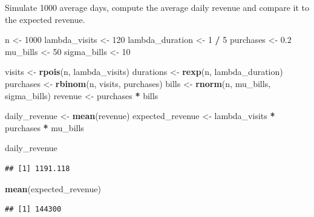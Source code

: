 \documentclass[
]{article}
\newenvironment{Shaded}{\begin{snugshade}}{\end{snugshade}}
\newcommand{\DecValTok}[1]{\textcolor[rgb]{0.00,0.00,0.81}{#1}}
\newcommand{\FloatTok}[1]{\textcolor[rgb]{0.00,0.00,0.81}{#1}}
\newcommand{\KeywordTok}[1]{\textcolor[rgb]{0.13,0.29,0.53}{\textbf{#1}}}
\newcommand{\NormalTok}[1]{#1}
\newcommand{\OperatorTok}[1]{\textcolor[rgb]{0.81,0.36,0.00}{\textbf{#1}}}
\newcommand{\StringTok}[1]{\textcolor[rgb]{0.31,0.60,0.02}{#1}}
\begin{document}
Simulate 1000 average days, compute the average daily revenue and
compare it to the expected revenue.

\begin{Shaded}
\begin{Highlighting}[]
\NormalTok{n \textless{}{-}}\StringTok{ }\DecValTok{1000}
\NormalTok{lambda\_visits \textless{}{-}}\StringTok{ }\DecValTok{120}
\NormalTok{lambda\_duration \textless{}{-}}\StringTok{ }\DecValTok{1} \OperatorTok{/}\StringTok{ }\DecValTok{5}
\NormalTok{purchases \textless{}{-}}\StringTok{ }\FloatTok{0.2}
\NormalTok{mu\_bills \textless{}{-}}\StringTok{ }\DecValTok{50}
\NormalTok{sigma\_bills \textless{}{-}}\StringTok{ }\DecValTok{10}

\NormalTok{visits \textless{}{-}}\StringTok{ }\KeywordTok{rpois}\NormalTok{(n, lambda\_visits)}
\NormalTok{durations \textless{}{-}}\StringTok{ }\KeywordTok{rexp}\NormalTok{(n, lambda\_duration)}
\NormalTok{purchases \textless{}{-}}\StringTok{ }\KeywordTok{rbinom}\NormalTok{(n, visits, purchases)}
\NormalTok{bills \textless{}{-}}\StringTok{ }\KeywordTok{rnorm}\NormalTok{(n, mu\_bills, sigma\_bills)}
\NormalTok{revenue \textless{}{-}}\StringTok{ }\NormalTok{purchases }\OperatorTok{*}\StringTok{ }\NormalTok{bills}

\NormalTok{daily\_revenue \textless{}{-}}\StringTok{ }\KeywordTok{mean}\NormalTok{(revenue)}
\NormalTok{expected\_revenue \textless{}{-}}\StringTok{ }\NormalTok{lambda\_visits }\OperatorTok{*}\StringTok{ }\NormalTok{purchases }\OperatorTok{*}\StringTok{ }\NormalTok{mu\_bills}

\NormalTok{daily\_revenue}
\end{Highlighting}
\end{Shaded}

\begin{verbatim}
## [1] 1191.118
\end{verbatim}

\begin{Shaded}
\begin{Highlighting}[]
\KeywordTok{mean}\NormalTok{(expected\_revenue)}
\end{Highlighting}
\end{Shaded}

\begin{verbatim}
## [1] 144300
\end{verbatim}
\end{document}
